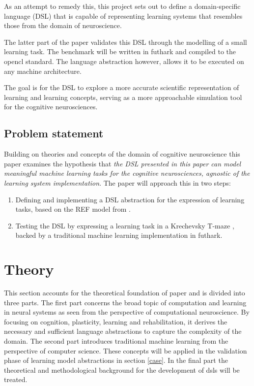 \documentclass[a4paper,oneside]{memoir}
\begin{document}
As an attempt to remedy this, this project sets out to define a domain-specific
language (DSL) that is capable of representing learning systems that resembles
those from the domain of neuroscience.

The latter part of the paper validates this DSL through the modelling of a small
learning task. The benchmark will be written in \gls{futhark} and compiled to
the \gls{opencl} standard. The language abstraction however, allows it to be
executed on any machine architecture.

The goal is for the DSL to explore a more accurate scientific representation of
learning and learning concepts, serving as a more approachable simulation tool
for the cognitive neurosciences.

\section{Problem statement}
Building on theories and concepts of the domain of cognitive neuroscience
this paper examines the hypothesis that
\textit{
  the DSL presented in this paper can model meaningful machine learning
  tasks for the cognitive neurosciences,
  agnostic of the learning system implementation}.
The paper will approach this in two steps:

\begin{enumerate}
  \item Defining and implementing a DSL abstraction for the expression of
        learning tasks, based on the REF model from \autocite{Mogensen2011}.
  \item Testing the DSL by expressing a learning task in a Krechevsky
        T-maze \autocite{Krechevsky1932}, backed by a traditional machine
        learning implementation in \gls{futhark}.
\end{enumerate}
%

{\let\clearpage\relax\chapter{Theory}}
This section accounts for the theoretical foundation of paper and is divided
into three parts.
The first part concerns the broad topic of computation and learning in neural
systems as seen from the perspective of computational neuroscience. By focusing
on cognition, plasticity, learning and rehabilitation, it derives
the necessary and sufficient language abstractions to capture the complexity
of the domain.
The second part introduces traditional machine learning from the perspective of
computer science. These concepts will be applied in the validation phase of
learning model abstractions in section \ref{case}.
In the final part the theoretical and methodological background for the
development of \gls{dsl}s will be treated.
\end{document}
